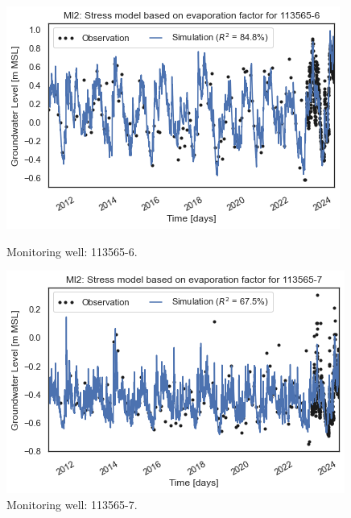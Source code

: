 \begin{figure}[htbp]
    \centering
    \begin{minipage}{0.32\textwidth}
        \centering
        \includegraphics[width=\linewidth]{frontmatter/Rozenburg-fig/1135656.png}
        \caption{Monitoring well: 113565-6.}
        \label{fig:113565-6}
    \end{minipage}
    \hfill
    \begin{minipage}{0.32\textwidth}
        \centering
        \includegraphics[width=\linewidth]{frontmatter/Rozenburg-fig/1135657.png}
        \caption{Monitoring well: 113565-7.}
        \label{fig:113565-7}
    \end{minipage}
    \hfill
    \begin{minipage}{0.32\textwidth}
        \centering

\end{minipage}
\end{figure}

